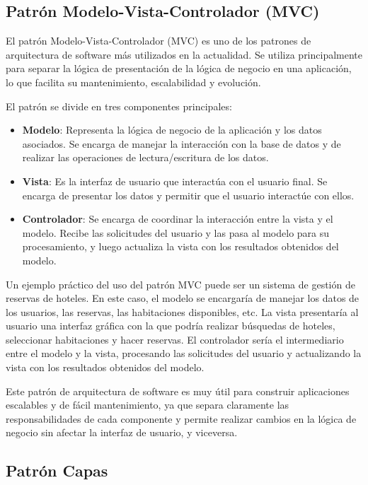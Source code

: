 \documentclass[executivepaper]{article}
\begin{document}
\subsection{Patrón Modelo-Vista-Controlador (MVC)}

El patrón Modelo-Vista-Controlador (MVC) es uno de los patrones de arquitectura de software más utilizados en la actualidad. Se utiliza principalmente para separar la lógica de presentación de la lógica de negocio en una aplicación, lo que facilita su mantenimiento, escalabilidad y evolución.

El patrón se divide en tres componentes principales:

\begin{itemize}
\item \textbf{Modelo}: Representa la lógica de negocio de la aplicación y los datos asociados. Se encarga de manejar la interacción con la base de datos y de realizar las operaciones de lectura/escritura de los datos.

\item \textbf{Vista}: Es la interfaz de usuario que interactúa con el usuario final. Se encarga de presentar los datos y permitir que el usuario interactúe con ellos.

\item \textbf{Controlador}: Se encarga de coordinar la interacción entre la vista y el modelo. Recibe las solicitudes del usuario y las pasa al modelo para su procesamiento, y luego actualiza la vista con los resultados obtenidos del modelo.
\end{itemize}

Un ejemplo práctico del uso del patrón MVC puede ser un sistema de gestión de reservas de hoteles. En este caso, el modelo se encargaría de manejar los datos de los usuarios, las reservas, las habitaciones disponibles, etc. La vista presentaría al usuario una interfaz gráfica con la que podría realizar búsquedas de hoteles, seleccionar habitaciones y hacer reservas. El controlador sería el intermediario entre el modelo y la vista, procesando las solicitudes del usuario y actualizando la vista con los resultados obtenidos del modelo.

Este patrón de arquitectura de software es muy útil para construir aplicaciones escalables y de fácil mantenimiento, ya que separa claramente las responsabilidades de cada componente y permite realizar cambios en la lógica de negocio sin afectar la interfaz de usuario, y viceversa.

\subsection{Patrón Capas}
\end{document}
